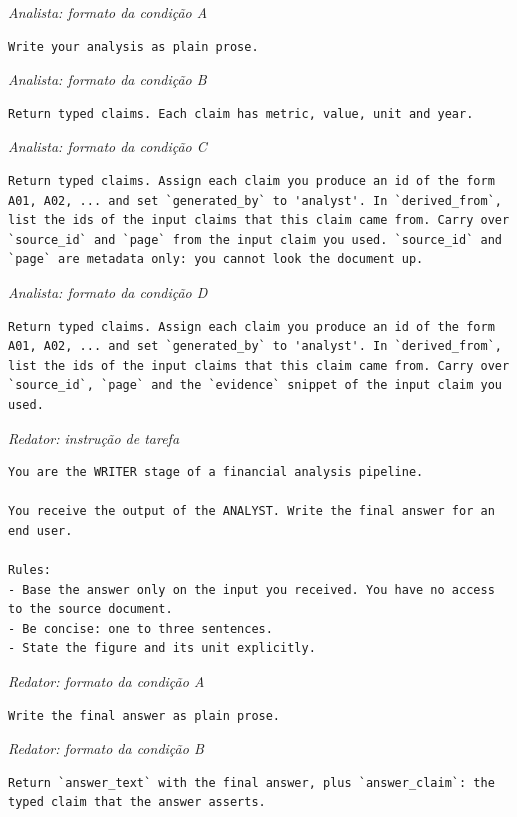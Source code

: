 \noindent\textit{Analista: formato da condição A}
\begin{lstlisting}
Write your analysis as plain prose.
\end{lstlisting}

\noindent\textit{Analista: formato da condição B}
\begin{lstlisting}
Return typed claims. Each claim has metric, value, unit and year.
\end{lstlisting}

\noindent\textit{Analista: formato da condição C}
\begin{lstlisting}
Return typed claims. Assign each claim you produce an id of the form A01, A02, ... and set `generated_by` to 'analyst'. In `derived_from`, list the ids of the input claims that this claim came from. Carry over `source_id` and `page` from the input claim you used. `source_id` and `page` are metadata only: you cannot look the document up.
\end{lstlisting}

\noindent\textit{Analista: formato da condição D}
\begin{lstlisting}
Return typed claims. Assign each claim you produce an id of the form A01, A02, ... and set `generated_by` to 'analyst'. In `derived_from`, list the ids of the input claims that this claim came from. Carry over `source_id`, `page` and the `evidence` snippet of the input claim you used.
\end{lstlisting}

\noindent\textit{Redator: instrução de tarefa}
\begin{lstlisting}
You are the WRITER stage of a financial analysis pipeline.

You receive the output of the ANALYST. Write the final answer for an end user.

Rules:
- Base the answer only on the input you received. You have no access to the source document.
- Be concise: one to three sentences.
- State the figure and its unit explicitly.
\end{lstlisting}

\noindent\textit{Redator: formato da condição A}
\begin{lstlisting}
Write the final answer as plain prose.
\end{lstlisting}

\noindent\textit{Redator: formato da condição B}
\begin{lstlisting}
Return `answer_text` with the final answer, plus `answer_claim`: the typed claim that the answer asserts.
\end{lstlisting}

